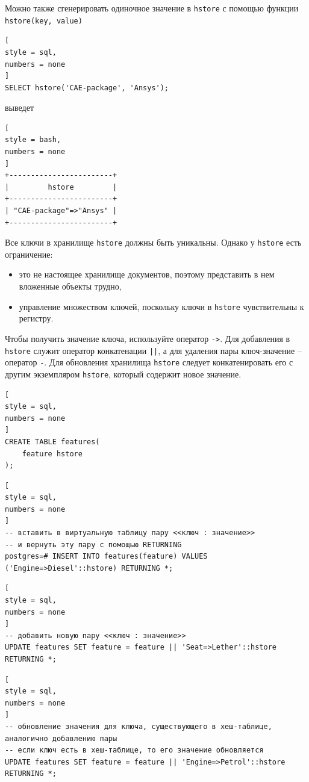 \documentclass[%
	11pt,
	a4paper,
	utf8,
		]{article}
\begin{document}
Можно также сгенерировать одиночное значение в \texttt{hstore} с помощью функции \texttt{hstore(key, value)}
\begin{lstlisting}[
style = sql,
numbers = none
]
SELECT hstore('CAE-package', 'Ansys');
\end{lstlisting}
выведет
\begin{lstlisting}[
style = bash,
numbers = none
]
+------------------------+
|         hstore         |
+------------------------+
| "CAE-package"=>"Ansys" |
+------------------------+
\end{lstlisting}

Все ключи в хранилище \texttt{hstore} должны быть уникальны. Однако у \texttt{hstore} есть ограничение:
\begin{itemize}
	\item это не настоящее хранилище документов, поэтому представить в нем вложенные объекты трудно,
	
	\item управление множеством ключей, поскольку ключи в \texttt{hstore} чувствительны к регистру.
\end{itemize}

Чтобы получить значение ключа, используйте оператор \texttt{->}. Для добавления в \texttt{hstore} служит оператор конкатенации \texttt{||}, а для удаления пары ключ-значение -- оператор \verb|-|. Для обновления хранилища \texttt{hstore} следует конкатенировать его с другим экземпляром \texttt{hstore}, который содержит новое значение.
\begin{lstlisting}[
style = sql,
numbers = none
]
CREATE TABLE features(
    feature hstore
);
\end{lstlisting}

\begin{lstlisting}[
style = sql,
numbers = none
]
-- вставить в виртуальную таблицу пару <<ключ : значение>>
-- и вернуть эту пару с помощью RETURNING
postgres=# INSERT INTO features(feature) VALUES ('Engine=>Diesel'::hstore) RETURNING *;
\end{lstlisting}

\begin{lstlisting}[
style = sql,
numbers = none
]
-- добавить новую пару <<ключ : значение>>
UPDATE features SET feature = feature || 'Seat=>Lether'::hstore RETURNING *;
\end{lstlisting}

\begin{lstlisting}[
style = sql,
numbers = none
]
-- обновление значения для ключа, существующего в хеш-таблице, аналогично добавлению пары
-- если ключ есть в хеш-таблице, то его значение обновляется
UPDATE features SET feature = feature || 'Engine=>Petrol'::hstore RETURNING *;
\end{lstlisting}
\end{document}
